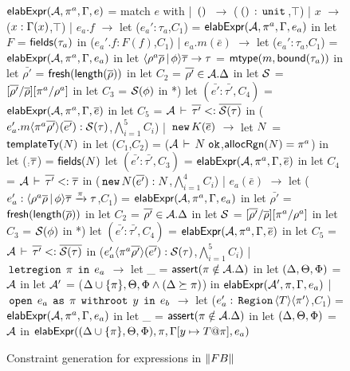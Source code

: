 \begin{figure}

\begin{codeml}
${\sf elabExpr}({\mathcal{A}},\pi^a,\Gamma,e)$ = 
  match $e$ with
  | $\,{\tt ()}\,$ $\longrightarrow$ ($\,{\tt ()}\,:\,{\tt unit}\,$,$\top$)
  | $x$ $\longrightarrow$ ($x:\Gamma(x)$,$\top$)
  | $e_a.f$ $\longrightarrow$ 
    let ($e_a':\tau_a$,$C_1$) = ${\sf elabExpr}({\mathcal{A}},\pi^a,\Gamma,e_a)$ in
    let $F$ = ${\sf fields}(\tau_a)$ in
      ($e_a'.f:F(f)$,$C_1$)
  | $e_a.m(\bar{e})$ $\longrightarrow$ 
    let ($e_a':\tau_a$,$C_1$) = ${\sf elabExpr}({\mathcal{A}},\pi^a,\Gamma,e_a)$ in
    let $\langle \rho^a\overline{\rho}\,|\,\phi \rangle\overline{\tau} \rightarrow \tau$ = ${\sf mtype}(m,{\sf bound}(\tau_a))$ in
    let $\bar{\rho'}$ = ${\sf fresh}({\sf length}(\overline{\rho}))$ in
    let $C_2$ = $\overline{\rho'} \in {\mathcal{A}}.\Delta$ in
    let $\mathcal{S}$ = $[\overline{\rho'}/\overline{\rho}][\pi^a/\rho^a]$ in
    let $C_3$ = $\mathcal{S}(\phi)$ in
*)   let $(\bar{e'}:\bar{\tau'}, C_4)$ = ${\sf elabExpr}({\mathcal{A}},\pi^a,\Gamma,\overline{e})$ in
    let $C_5$ = ${\mathcal{A}}\,\vdash\,\overline{\tau'} <: \overline{\mathcal{S}(\tau)}$ in
      ($e_a'.m\langle \pi^a\overline{\rho'} \rangle(\overline{e'}):\mathcal{S}(\tau)$,$\bigwedge_{i=1}^5 C_i$)
  | $\,{\tt new}\, K(\overline{e})$ $\longrightarrow$ 
    let $N$ = ${\sf templateTy}(N)$ in
    let ($C_1$,$C_2$) = (${\mathcal{A}}\,\vdash\,N \; \texttt{ok}$,${\sf allocRgn}(N)=\pi^a$) in
    let ($_:\overline{\tau}$) = ${\sf fields}(N)$
    let $(\bar{e'}:\bar{\tau'}, C_3)$ = ${\sf elabExpr}({\mathcal{A}},\pi^a,\Gamma,\overline{e})$ in
    let $C_4$ = ${\mathcal{A}}\,\vdash\,\overline{\tau'} <: \overline{\tau}$ in
      ($\,{\tt new}\, N(\overline{e'}) : N$,$\bigwedge_{i=1}^4 C_i$)
  | $e_a(\bar{e})$ $\longrightarrow$ 
    let ($e_a':\langle \rho^a\overline{\rho}\,|\,\phi \rangle\overline{\tau} \xrightarrow{\pi} \tau$,$C_1$) = 
                ${\sf elabExpr}({\mathcal{A}},\pi^a,\Gamma,e_a)$ in
    let $\bar{\rho'}$ = ${\sf fresh}({\sf length}(\overline{\rho}))$ in
    let $C_2$ = $\overline{\rho'} \in {\mathcal{A}}.\Delta$ in
    let $\mathcal{S}$ = $[\overline{\rho'}/\overline{\rho}][\pi^a/\rho^a]$ in
    let $C_3$ = $\mathcal{S}(\phi)$ in
*)   let $(\bar{e'}:\bar{\tau'}, C_4)$ = ${\sf elabExpr}({\mathcal{A}},\pi^a,\Gamma,\overline{e})$ in
    let $C_5$ = ${\mathcal{A}}\,\vdash\,\overline{\tau'} <: \overline{\mathcal{S}(\tau)}$ in
      ($e_a'\langle \pi^a\overline{\rho'} \rangle(\overline{e'}):\mathcal{S}(\tau)$,$\bigwedge_{i=1}^5 C_i$)
  | $\,{\tt letregion}\,\;\pi\;\,{\tt in}\,\;e_a$ $\longrightarrow$
    let _ = ${\sf assert}(\pi \notin {\mathcal{A}}.\Delta)$ in
    let $(\Delta,\Theta,\Phi)$ = ${\mathcal{A}}$ in
    let ${\mathcal{A}}'$ = ($\Delta \cup \{\pi\}, \Theta, \Phi \wedge (\Delta \succeq \pi)$) in
      ${\sf elabExpr}({\mathcal{A}}',\pi,\Gamma,e_a)$ 
  | $\,{\tt open}\,\;e_a\;\,{\tt as}\,\;\pi\;\,{\tt withroot}\,\;y\;\,{\tt in}\,\;e_b$ $\longrightarrow$ 
    let ($e_a':\,{\tt Region}\,\langle T \rangle\langle \pi' \rangle$,$C_1$) = 
                ${\sf elabExpr}({\mathcal{A}},\pi^a,\Gamma,e_a)$ in
    let _ = ${\sf assert}(\pi \notin {\mathcal{A}}.\Delta)$ in
    let $(\Delta,\Theta,\Phi)$ = ${\mathcal{A}}$ in
      ${\sf elabExpr}((\Delta \cup \{\pi\},\Theta,\Phi),\pi,\Gamma[y\mapsto T@\pi],e_a)$ 
\end{codeml}

\caption{Constraint generation for expressions in $\left\| {\sc FB} \right\|$}
\label{fig:fb-constraintgen}
\end{figure}
